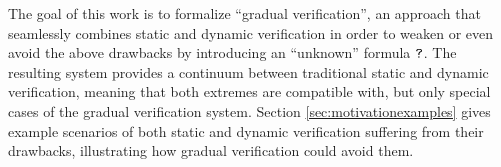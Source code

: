 The goal of this work is to formalize “gradual verification”, an approach that seamlessly combines static and dynamic verification in order to weaken or even avoid the above drawbacks by introducing an “unknown” formula $\textup{\texttt{?}}$.
The resulting system provides a continuum between traditional static and dynamic verification, meaning that both extremes are compatible with, but only special cases of the gradual verification system.
Section \ref{sec:motivationexamples} gives example scenarios of both static and dynamic verification suffering from their drawbacks, illustrating how gradual verification could avoid them.

\begin{comment}

Most modern programming languages use static methods to some degree, ruling out at least some types of runtime failure.
Static typing disciplines are among the most common representatives, guaranteeing type safety at compile time, obviating the need for dynamic checks.
Yet, the rigidity and limitations of static type systems resulted in the introduction of dynamic aspects into the otherwise static system:
Casts (e.g. as implemented in C\# or Java) overrule purely static reasoning, allowing the static type system to treat an expression as if it had the claimed type (usually a subtype) instead of the deduced one.
At this location, a runtime check is introduced, resulting in a cast exception should the programmer's claim turn out wrong.
Note that such deviations from a purely static type system (one where there is no need for runtime checks) do not affect type safety:
It is still guaranteed that execution does not enter an inconsistent state by simply interrupting execution whenever a runtime type check fails.

Note that casts are necessary only because of a typical drawback of static systems, namely the limitation of the underlying logic.
More sophisticated type systems (e.g. the one in Haskell) might have been able to deduce the claimed type in the first place.


In contrast, general purpose static verification techniques are not common amongst popular programming languages.
Note that such languages are usually driven by cost-benefit and usability considerations, meaning that static verification is apparently not yet in a stage where its cost clearly outweighs its benefits.
\end{comment}

